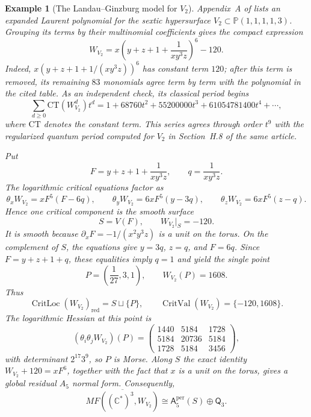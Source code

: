 \documentclass[11pt]{amsart}
\newtheorem{example}{Example}[section]
\DeclareMathOperator{\CritVal}{CritVal}
\DeclareMathOperator{\CritLoc}{CritLoc}
\newcommand{\MorseCat}[1]{\mathsf{Q}_{#1}}
\newcommand{\Aper}[2]{\mathsf{A}^{\mathrm{per}}_{#2}(#1)}
\begin{document}
\begin{example}[The Landau--Ginzburg model for $V_2$]
Appendix~A of \cite{CoatesCortiGalkinKasprzyk2016} lists an expanded
Laurent polynomial for the sextic hypersurface
$V_2\subset\mathbb P(1,1,1,1,3)$. Grouping its terms by their multinomial
coefficients gives the compact expression
\[
W_{V_2}
=x\left(y+z+1+\frac{1}{xy^3z}\right)^6-120.
\]
Indeed, $x(y+z+1+1/(xy^3z))^6$ has constant term $120$; after this term is
removed, its remaining $83$ monomials agree term by term with the polynomial
in the cited table. As an independent check, its classical period begins
\[
\sum_{d\geq0}\mathrm{CT}(W_{V_2}^d)t^d
=1+68760t^2+55200000t^3+61054781400t^4+\cdots,
\]
where $\mathrm{CT}$ denotes the constant term. This series agrees through
order $t^9$ with the regularized quantum period computed for $V_2$ in
Section~H.8 of the same article.

Put
\[
F=y+z+1+\frac{1}{xy^3z},
\qquad
q=\frac{1}{xy^3z}.
\]
The logarithmic critical equations factor as
\[
\theta_xW_{V_2}=xF^5(F-6q),
\qquad
\theta_yW_{V_2}=6xF^5(y-3q),
\qquad
\theta_zW_{V_2}=6xF^5(z-q).
\]
Hence one critical component is the smooth surface
\[
S=V(F),
\qquad
W_{V_2}|_S=-120.
\]
It is smooth because
$\partial_xF=-1/(x^2y^3z)$ is a unit on the torus.  On the complement of
$S$, the equations give $y=3q$, $z=q$, and $F=6q$. Since
$F=y+z+1+q$, these equalities imply $q=1$ and yield the single point
\[
P=\left(\frac1{27},3,1\right),
\qquad
W_{V_2}(P)=1608.
\]
Thus
\[
\CritLoc(W_{V_2})_{\mathrm{red}}=S\sqcup\{P\},
\qquad
\CritVal(W_{V_2})=\{-120,1608\}.
\]
The logarithmic Hessian at this point is
\[
(\theta_i\theta_jW_{V_2})(P)=
\begin{pmatrix}
1440&5184&1728\\
5184&20736&5184\\
1728&5184&3456
\end{pmatrix},
\]
with determinant $2^{17}3^9$, so $P$ is Morse. Along $S$ the exact identity
$W_{V_2}+120=xF^6$, together with the fact that $x$ is a unit on the torus,
gives a global residual $A_5$ normal form. Consequently,
\[
\overline{MF((\mathbb C^*)^3,W_{V_2})}
\cong
\Aper{S}{5}\oplus\MorseCat{3}.
\]
\end{example}
\end{document}
